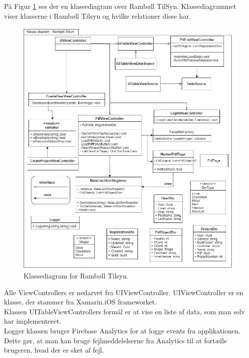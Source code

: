 På Figur \ref{fig:KlasseDiagram} ses der en klassediagram over Rambøll TilSyn. Klassediagrammet viser klasserne i Rambøll Tilsyn og hvilke relationer disse har.
\begin{figure}[H] %
	\centering
	\includegraphics[height=13cm, width=17cm]{Arkitektur/KlasseDiagram}
	\caption{Klassediagram for Rambøll Tilsyn.}
	\label{fig:KlasseDiagram}
\end{figure}


Alle ViewControllers er nedarvet fra UIViewController\cite{UIViewController}. UIViewController er en klasse, der stammer fra Xamarin.iOS frameworket. \\
Klassen UITableViewControllers formål er at vise en liste af data, som man selv har implementeret. \\
Logger klassen bruger Firebase Analytics\cite{FirebaseAnalytic} for at logge events fra applikationen. Dette gør, at man kan bruge fejlmeddelelserne fra Analytics til at fortælle brugeren, hvad der er sket af fejl.  
